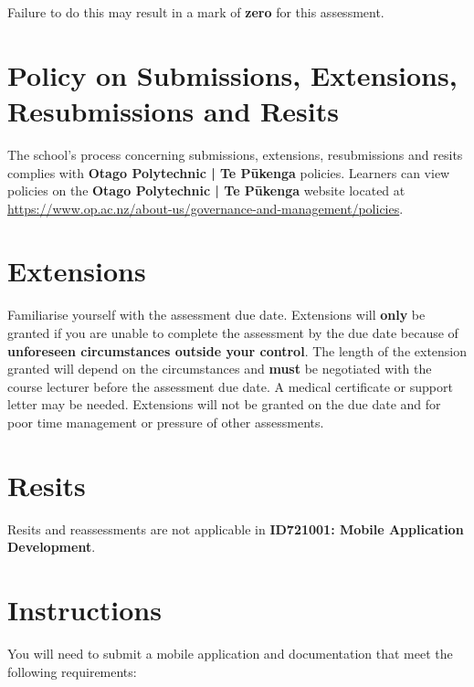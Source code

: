 \documentclass{article}
\begin{document}
 Failure to do this may result in a mark of \textbf{zero} for this assessment.

\section*{Policy on Submissions, Extensions, Resubmissions and Resits}
The school's process concerning submissions, extensions, resubmissions and resits complies with \textbf{Otago Polytechnic | Te Pūkenga} policies. Learners can view policies on the \textbf{Otago Polytechnic | Te Pūkenga} website located at \href{https://www.op.ac.nz/about-us/governance-and-management/policies}{https://www.op.ac.nz/about-us/governance-and-management/policies}.  

\section*{Extensions}
Familiarise yourself with the assessment due date. Extensions will \textbf{only} be granted if you are unable to complete the assessment by the due date because of \textbf{unforeseen circumstances outside your control}. The length of the extension granted will depend on the circumstances and \textbf{must} be negotiated with the course lecturer before the assessment due date. A medical certificate or support letter may be needed. Extensions will not be granted on the due date and for poor time management or pressure of other assessments.

\section*{Resits}
Resits and reassessments are not applicable in \textbf{ID721001: Mobile Application Development}.

\section*{Instructions}
You will need to submit a mobile application and documentation that meet the following requirements:
\end{document}
